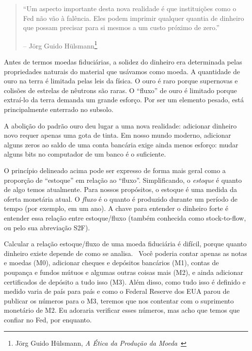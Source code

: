 \begin{samepage}\begin{quotation}
\enquote{Um aspecto importante desta nova realidade é que instituições como o Fed não vão à falência. Eles podem imprimir qualquer quantia de dinheiro que possam precisar para si mesmos a um custo próximo de zero.}
\begin{flushright} -- Jörg Guido Hülsmann\footnote{Jörg Guido Hülsmann, \textit{A Ética da Produção da Moeda}~\cite{hulsmann2008ethics}}
\end{flushright}\end{quotation}\end{samepage}

Antes de termos moedas fiduciárias, a solidez do dinheiro era determinada pelas propriedades naturais do material que usávamos como moeda. A quantidade de ouro na terra é limitada pelas leis da física. O ouro é raro porque supernovas e colisões de estrelas de nêutrons são raras. O \enquote{fluxo} de ouro é limitado porque extraí-lo da terra demanda um grande esforço. Por ser um elemento pesado, está principalmente enterrado no subsolo.

A abolição do padrão ouro deu lugar a uma nova realidade: adicionar dinheiro novo requer apenas uma gota de tinta. Em nosso mundo moderno, adicionar alguns zeros ao saldo de uma conta bancária exige ainda menos esforço: mudar alguns bits no computador de um banco é o suficiente.

O princípio delineado acima pode ser expresso de forma mais geral como a proporção de \enquote{estoque} em relação ao \enquote{fluxo}. Simplificando, o \textit{estoque} é quanto de algo temos atualmente. Para nossos propósitos, o estoque é uma medida da oferta monetária atual. O \textit{fluxo} é o quanto é produzido durante um período de tempo (por exemplo, em um ano). A chave para entender o dinheiro forte é entender essa relação entre estoque/fluxo (também conhecida como stock-to-flow, ou pelo sua abreviação S2F).

Calcular a relação estoque/fluxo de uma moeda fiduciária é difícil, porque quanto dinheiro existe depende de como se analisa.~\cite{wiki:money-supply} Você poderia contar apenas as notas e moedas (M0), adicionar cheques e depósitos bancários (M1), contas de poupança e fundos mútuos e algumas outras coisas mais (M2), e ainda adicionar certificados de depósito a tudo isso (M3). Além disso, como tudo isso é definido e medido varia de país para país e como o Federal Reserve dos EUA parou de publicar os números \cite{web:fed-m3} para o M3, teremos que nos contentar com o suprimento monetário de M2. Eu adoraria verificar esses números, mas acho que temos que confiar no Fed, por enquanto.

